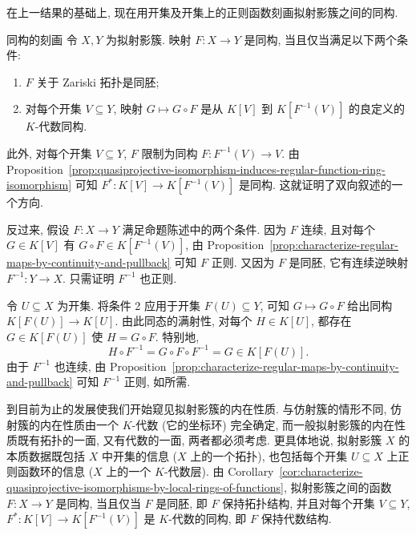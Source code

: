 在上一结果的基础上, 现在用开集及开集上的正则函数刻画拟射影簇之间的同构.

\begin{Corollary}{同构的刻画}\leavevmode\label{cor:characterize-quasiprojective-isomorphisms-by-local-rings-of-functions}
令 $X,Y$ 为拟射影簇. 映射 $F:X\to Y$ 是同构, 当且仅当满足以下两个条件:
\begin{enumerate}[label=\arabic*.]
  \item $F$ 关于 Zariski 拓扑是同胚;
  \item 对每个开集 $V\subseteq Y$, 映射 $G\mapsto G\circ F$ 是从 $K[V]$ 到 $K[F^{-1}(V)]$ 的良定义的 $K$-代数同构.
\end{enumerate}
\end{Corollary}
\begin{Proof}
此外, 对每个开集 $V\subseteq Y$, $F$ 限制为同构 $F:F^{-1}(V)\to V$. 由 Proposition~\ref{prop:quasiprojective-isomorphism-induces-regular-function-ring-isomorphism} 可知 $F^{*}:K[V]\to K[F^{-1}(V)]$ 是同构. 这就证明了双向叙述的一个方向.

反过来, 假设 $F:X\to Y$ 满足命题陈述中的两个条件. 因为 $F$ 连续, 且对每个 $G\in K[V]$ 有 $G\circ F\in K[F^{-1}(V)]$, 由 Proposition~\ref{prop:characterize-regular-maps-by-continuity-and-pullback} 可知 $F$ 正则. 又因为 $F$ 是同胚, 它有连续逆映射 $F^{-1}:Y\to X$. 只需证明 $F^{-1}$ 也正则.

令 $U\subseteq X$ 为开集. 将条件 2 应用于开集 $F(U)\subseteq Y$, 可知 $G\mapsto G\circ F$ 给出同构 $K[F(U)]\to K[U]$. 由此同态的满射性, 对每个 $H\in K[U]$, 都存在 $G\in K[F(U)]$ 使 $H=G\circ F$. 特别地,
\[
  H\circ F^{-1}=G\circ F\circ F^{-1}=G\in K[F(U)].
\]
由于 $F^{-1}$ 也连续, 由 Proposition~\ref{prop:characterize-regular-maps-by-continuity-and-pullback} 可知 $F^{-1}$ 正则, 如所需.
\end{Proof}

到目前为止的发展使我们开始窥见拟射影簇的内在性质. 与仿射簇的情形不同, 仿射簇的内在性质由一个 $K$-代数 (它的坐标环) 完全确定, 而一般拟射影簇的内在性质既有拓扑的一面, 又有代数的一面, 两者都必须考虑. 更具体地说, 拟射影簇 $X$ 的本质数据既包括 $X$ 中开集的信息 ($X$ 上的一个拓扑), 也包括每个开集 $U\subseteq X$ 上正则函数环的信息 ($X$ 上的一个 $K$-代数\textquotedbl{}层\textquotedbl{}). 由 Corollary~\ref{cor:characterize-quasiprojective-isomorphisms-by-local-rings-of-functions}, 拟射影簇之间的函数 $F:X\to Y$ 是同构, 当且仅当 $F$ 是同胚, 即 $F$ 保持拓扑结构, 并且对每个开集 $V\subseteq Y$, $F^{*}:K[V]\to K[F^{-1}(V)]$ 是 $K$-代数的同构, 即 $F$ 保持代数结构.

